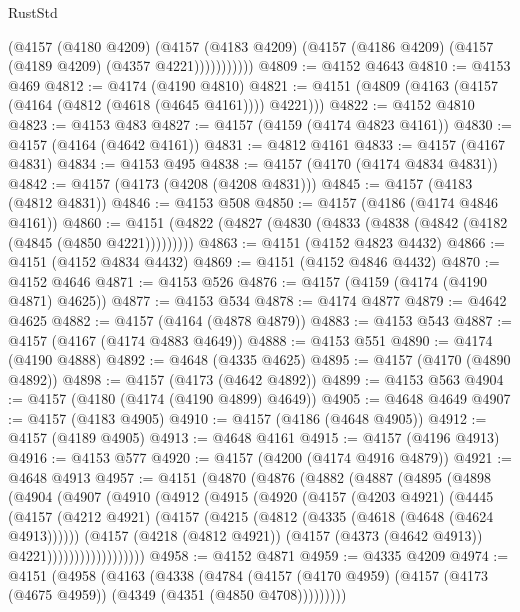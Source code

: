 \begin{lexlean}{RustStd}
\begin{coremodule}
                (@4157
                  (@4180 @4209)
                  (@4157
                    (@4183 @4209)
                    (@4157 (@4186 @4209) (@4157 (@4189 @4209) (@4357 @4221)))))))))))
@4809 := @4152 @4643
@4810 := @4153 @469
@4812 := @4174 (@4190 @4810)
@4821 := @4151 (@4809 (@4163 (@4157 (@4164 (@4812 (@4618 (@4645 @4161)))) @4221)))
@4822 := @4152 @4810
@4823 := @4153 @483
@4827 := @4157 (@4159 (@4174 @4823 @4161))
@4830 := @4157 (@4164 (@4642 @4161))
@4831 := @4812 @4161
@4833 := @4157 (@4167 @4831)
@4834 := @4153 @495
@4838 := @4157 (@4170 (@4174 @4834 @4831))
@4842 := @4157 (@4173 (@4208 (@4208 @4831)))
@4845 := @4157 (@4183 (@4812 @4831))
@4846 := @4153 @508
@4850 := @4157 (@4186 (@4174 @4846 @4161))
@4860 := @4151 (@4822 (@4827 (@4830 (@4833 (@4838 (@4842 (@4182 (@4845 (@4850 @4221)))))))))
@4863 := @4151 (@4152 @4823 @4432)
@4866 := @4151 (@4152 @4834 @4432)
@4869 := @4151 (@4152 @4846 @4432)
@4870 := @4152 @4646
@4871 := @4153 @526
@4876 := @4157 (@4159 (@4174 (@4190 @4871) @4625))
@4877 := @4153 @534
@4878 := @4174 @4877
@4879 := @4642 @4625
@4882 := @4157 (@4164 (@4878 @4879))
@4883 := @4153 @543
@4887 := @4157 (@4167 (@4174 @4883 @4649))
@4888 := @4153 @551
@4890 := @4174 (@4190 @4888)
@4892 := @4648 (@4335 @4625)
@4895 := @4157 (@4170 (@4890 @4892))
@4898 := @4157 (@4173 (@4642 @4892))
@4899 := @4153 @563
@4904 := @4157 (@4180 (@4174 (@4190 @4899) @4649))
@4905 := @4648 @4649
@4907 := @4157 (@4183 @4905)
@4910 := @4157 (@4186 (@4648 @4905))
@4912 := @4157 (@4189 @4905)
@4913 := @4648 @4161
@4915 := @4157 (@4196 @4913)
@4916 := @4153 @577
@4920 := @4157 (@4200 (@4174 @4916 @4879))
@4921 := @4648 @4913
@4957 := @4151
    (@4870
      (@4876
        (@4882
          (@4887
            (@4895
              (@4898
                (@4904
                  (@4907
                    (@4910
                      (@4912
                        (@4915
                          (@4920
                            (@4157
                              (@4203 @4921)
                              (@4445
                                (@4157
                                  (@4212 @4921)
                                  (@4157
                                    (@4215 (@4812 (@4335 (@4618 (@4648 (@4624 @4913))))))
                                    (@4157
                                      (@4218 (@4812 @4921))
                                      (@4157 (@4373 (@4642 @4913)) @4221))))))))))))))))))
@4958 := @4152 @4871
@4959 := @4335 @4209
@4974 := @4151
    (@4958
      (@4163
        (@4338
          (@4784
            (@4157 (@4170 @4959) (@4157 (@4173 (@4675 @4959)) (@4349 (@4351 (@4850 @4708)))))))))

\end{coremodule}
\end{lexlean}
